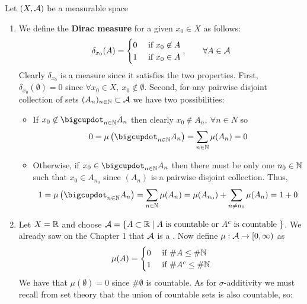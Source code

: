 \begin{eg}
	Let $(X, \mathcal{A})$ be a measurable space
	\begin{enumerate}
		\item We define the \textbf{Dirac measure} for a given $x_0 \in X$ as follows:
		\begin{align*}
			\delta_{x_0}(A) = \begin{cases}
			0 &\text{ if } x_0\not\in A \\
			1 &\text{ if } x_0 \in A
			\end{cases},\qquad \forall A \in \mathcal{A}
		\end{align*}
		Clearly $\delta_{x_0}$ is a measure since it satisfies the two properties. First, $\delta_{x_0}(\emptyset) = 0$ since $\forall x_0 \in X,\ x_0 \not\in \emptyset$. Second, for any pairwise disjoint collection of sets $(A_n)_{n\in\mathbb{N}} \subset \mathcal{A}$ we have two possibilities:
		\begin{itemize}
			\item If $x_0 \not\in \bigcupdot_{n \in \N} A_n$ then clearly $x_0 \not\in A_n,\ \forall n \in N$ so
			\begin{align*}
				0 = \mu\left(\bigcupdot_{n \in \N} A_n\right) = \sum_{n\in \N} \mu(A_n) = 0
			\end{align*}
			\item Otherwise, if $x_0 \in \bigcupdot_{n \in \N} A_n$ then there must be only one $n_0 \in \mathbb{N}$ such that $x_0 \in A_{n_0}$ since $(A_n)$ is a pairwise disjoint collection. Thus,
			\begin{align*}
				1 = \mu\left(\bigcupdot_{n \in \N} A_n\right) = \sum_{n\in \N} \mu(A_n) = \mu(A_{n_0}) + \sum_{n \neq n_0} \mu(A_n) = 1 + 0
			\end{align*}
		\end{itemize}
	\item Let $X = \mathbb{R}$ and choose $\mathcal{A} = \{A \subset \mathbb{R} \mid A\text{ is countable or } A^c \text{ is countable }\}$. We already saw on the Chapter 1 that $\mathcal{A}$ is a \siga. Now define $\mu:\mathcal{A} \to [0, \infty)$ as
	\begin{align*}
		\mu(A) = \begin{cases}
		0 &\text{ if } \# A \leq \# \mathbb{N} \\
		1 &\text{ if } \# A^c \leq \# \mathbb{N}
		\end{cases}
	\end{align*}
	We have that $\mu(\emptyset) = 0$ since $\#\emptyset$ is countable. As for $\sigma$-additivity we must recall from set theory that the union of countable sets is also countable, so:

\end{enumerate}
\end{eg}
